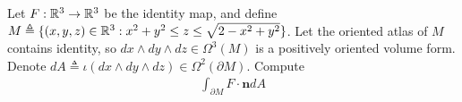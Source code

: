 \documentclass{report}
\begin{document}
\begin{question}{}{}
Let $F:\mathbb{R}^3 \rightarrow \mathbb{R}^3$ be the identity map, and define $M\triangleq \{ (x,y,z)\in\mathbb{R}^3: x^2+y^2 \leq z \leq \sqrt{2-x^2+y^2} \}$. Let the oriented atlas of $M$ contains identity, so $dx\wedge  dy \wedge  dz \in \Omega^3 (M)$ is a positively oriented volume form. Denote $dA\triangleq \iota (dx\wedge  dy \wedge  dz) \in \Omega^2 (\partial M)$. Compute 
\begin{align*}
\int_{\partial M} F \cdot \textbf{n} dA
\end{align*}
\end{question}
\end{document}
